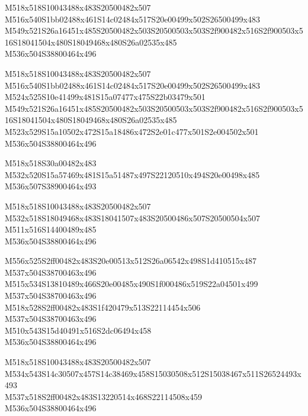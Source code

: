\documentclass{article}
\begin{document}
\begin{multicols}{5}
\begin{center}

M518x518S10043488x483S20500482x507 %
\\M516x540S1bb02488x461S14c02484x517S20e00499x502S26500499x483 %
\\M549x521S26a16451x485S20500482x503S20500503x503S2f900482x516S2f900503x516S18041504x480S18049468x480S26a02535x485 %
\\M536x504S38800464x496 %

M518x518S10043488x483S20500482x507 %
\\M516x540S1bb02488x461S14c02484x517S20e00499x502S26500499x483 %
\\M524x525S10e41499x481S15a07477x475S22b03479x501 %
\\M549x521S26a16451x485S20500482x503S20500503x503S2f900482x516S2f900503x516S18041504x480S18049468x480S26a02535x485 %
\\M523x529S15a10502x472S15a18486x472S2e01c477x501S2e004502x501 %
\\M536x504S38800464x496 %

M518x518S30a00482x483 %
\\M532x520S15a57469x481S15a51487x497S22120510x494S20e00498x485 %
\\M536x507S38900464x493 %

M518x518S10043488x483S20500482x507 %
\\M532x518S18049468x483S18041507x483S20500486x507S20500504x507 %
\\M511x516S14400489x485 %
\\M536x504S38800464x496 %

M556x525S2ff00482x483S20e00513x512S26a06542x498S1d410515x487 %
\\M537x504S38700463x496 %
\\M515x534S13810489x466S20e00485x490S1f000486x519S22a04501x499 %
\\M537x504S38700463x496 %
\\M518x528S2ff00482x483S1f420479x513S22114454x506 %
\\M537x504S38700463x496 %
\\M510x543S15d40491x516S2dc06494x458 %
\\M536x504S38800464x496 %

M518x518S10043488x483S20500482x507 %
\\M534x543S14c30507x457S14c38469x458S15030508x512S15038467x511S26524493x493 %
\\M537x518S2ff00482x483S13220514x468S22114508x459 %
\\M536x504S38800464x496 %


\end{center}
\end{multicols}
\end{document}
